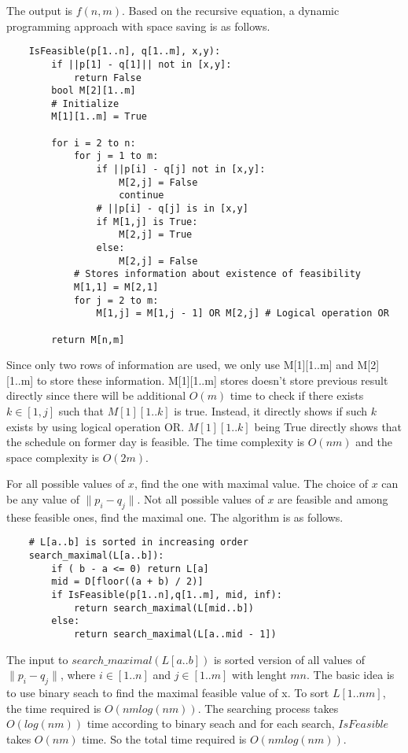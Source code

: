 \documentclass[12pt,a4paper]{article}
\newcommand{\question}[1]{\bigskip\noindent{\textbf{Q{#1} solution}}}
\begin{document}
The output is $f(n, m)$. Based on the recursive equation, a dynamic programming approach with space saving is as follows.

\begin{lstlisting}
	IsFeasible(p[1..n], q[1..m], x,y):
		if ||p[1] - q[1]|| not in [x,y]:
			return False
		bool M[2][1..m] 
		# Initialize
		M[1][1..m] = True

		for i = 2 to n:
			for j = 1 to m:
				if ||p[i] - q[j] not in [x,y]:
					M[2,j] = False
					continue
				# ||p[i] - q[j] is in [x,y]
				if M[1,j] is True:
					M[2,j] = True
				else:
					M[2,j] = False
			# Stores information about existence of feasibility
			M[1,1] = M[2,1]
			for j = 2 to m:
				M[1,j] = M[1,j - 1] OR M[2,j] # Logical operation OR

		return M[n,m]	
\end{lstlisting}

Since only two rows of information are used, we only use M[1][1..m] and M[2][1..m] to store these information. M[1][1..m] stores doesn't store previous result directly since there will be additional $O(m)$ time to check if there exists $k \in [1,j]$ such that $M[1][1..k]$ is true. Instead, it directly shows if such $k$ exists by using logical operation OR. $M[1][1..k]$ being True directly shows that the schedule on former day is feasible. The time complexity is $O(nm)$ and the space complexity is $O(2m)$.

\question{21.B}

For all possible values of $x$, find the one with maximal value. The choice of $x$ can be any value of $\|p_i - q_j\|$. Not all possible values of $x$ are feasible and among these feasible ones, find the maximal one. The algorithm is as follows.
\begin{lstlisting}
	# L[a..b] is sorted in increasing order
	search_maximal(L[a..b]):
		if ( b - a <= 0) return L[a]
		mid = D[floor((a + b) / 2)]
		if IsFeasible(p[1..n],q[1..m], mid, inf):
			return search_maximal(L[mid..b])
		else:
			return search_maximal(L[a..mid - 1])
\end{lstlisting}

The input to $search\_maximal(L[a..b])$ is sorted version of all values of $\|p_i - q_j\|$, where $i \in [1..n]$ and $j \in [1..m]$ with lenght $mn$. The basic idea is to use binary seach to find the maximal feasible value of x. To sort $L[1..nm]$, the time required is $O(nmlog(nm))$. The searching process takes $O(log(nm))$ time according to binary seach and for each search, $IsFeasible$ takes $O(nm)$ time. So the total time required is $O(nmlog(nm))$.
\end{document}

